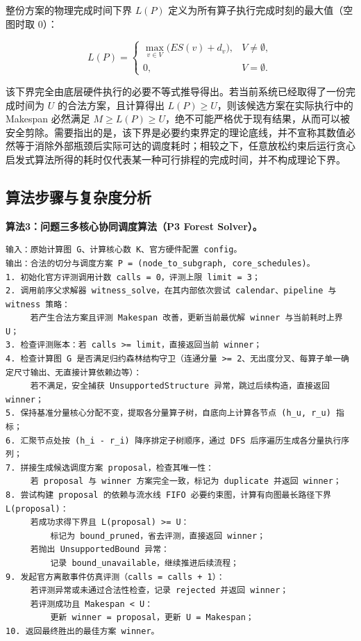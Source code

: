 \documentclass[anonymous,notoc]{gmcm2026}
\begin{document}
整份方案的物理完成时间下界 \(L(P)\) 定义为所有算子执行完成时刻的最大值（空图时取 0）：

\begin{equation}
L(P) = \begin{cases} \displaystyle \max_{v \in V} \bigl( ES(v) + d_v \bigr), & V \ne \emptyset, \\ 0, & V = \emptyset. \end{cases}
\end{equation}

该下界完全由底层硬件执行的必要不等式推导得出。若当前系统已经取得了一份完成时间为 \(U\) 的合法方案，且计算得出 \(L(P) \ge U\)，则该候选方案在实际执行中的 Makespan 必然满足 \(M \ge L(P) \ge U\)，绝不可能严格优于现有结果，从而可以被安全剪除。需要指出的是，该下界是必要约束界定的理论底线，并不宣称其数值必然等于消除外部瓶颈后实际可达的调度耗时；相较之下，任意放松约束后运行贪心启发式算法所得的耗时仅代表某一种可行排程的完成时间，并不构成理论下界。

\subsection{算法步骤与复杂度分析}

\textbf{算法3：问题三多核心协同调度算法（P3 Forest Solver）。}

\begin{lstlisting}[style=gmcmappendix,language={}]
输入：原始计算图 G、计算核心数 K、官方硬件配置 config。
输出：合法的切分与调度方案 P = (node_to_subgraph, core_schedules)。
1. 初始化官方评测调用计数 calls = 0，评测上限 limit = 3；
2. 调用前序父求解器 witness_solve，在其内部依次尝试 calendar、pipeline 与 witness 策略：
     若产生合法方案且评测 Makespan 改善，更新当前最优解 winner 与当前耗时上界 U；
3. 检查评测账本：若 calls >= limit，直接返回当前 winner；
4. 检查计算图 G 是否满足归约森林结构守卫（连通分量 >= 2、无出度分叉、每算子单一确定尺寸输出、无直接计算依赖边等）：
     若不满足，安全捕获 UnsupportedStructure 异常，跳过后续构造，直接返回 winner；
5. 保持基准分量核心分配不变，提取各分量算子树，自底向上计算各节点 (h_u, r_u) 指标；
6. 汇聚节点处按 (h_i - r_i) 降序排定子树顺序，通过 DFS 后序遍历生成各分量执行序列；
7. 拼接生成候选调度方案 proposal，检查其唯一性：
     若 proposal 与 winner 方案完全一致，标记为 duplicate 并返回 winner；
8. 尝试构建 proposal 的依赖与流水线 FIFO 必要约束图，计算有向图最长路径下界 L(proposal)：
     若成功求得下界且 L(proposal) >= U：
         标记为 bound_pruned，省去评测，直接返回 winner；
     若抛出 UnsupportedBound 异常：
         记录 bound_unavailable，继续推进后续流程；
9. 发起官方离散事件仿真评测（calls = calls + 1）：
     若评测异常或未通过合法性检查，记录 rejected 并返回 winner；
     若评测成功且 Makespan < U：
         更新 winner = proposal，更新 U = Makespan；
10. 返回最终胜出的最佳方案 winner。
\end{lstlisting}
\end{document}
